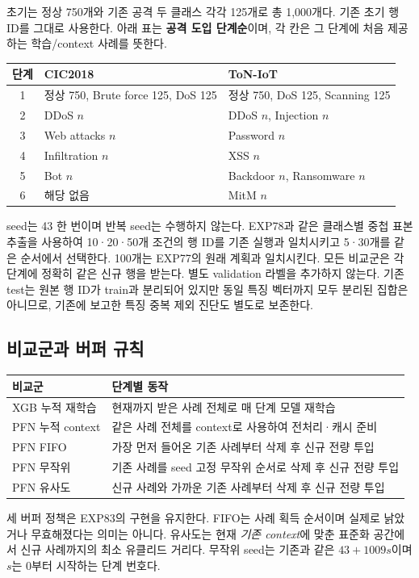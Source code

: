 초기는 정상 750개와 기존 공격 두 클래스 각각 125개로 총 1,000개다. 기존 초기 행 ID를 그대로 사용한다. 아래 표는 \textbf{공격 도입 단계순}이며, 각 칸은 그 단계에 처음 제공하는 학습/context 사례를 뜻한다.
\begin{table}[H]\centering\small
\begin{tabular}{cll}
\toprule
단계 & CIC2018 & ToN-IoT\\\midrule
1 & 정상 750, Brute force 125, DoS 125 & 정상 750, DoS 125, Scanning 125\\
2 & DDoS $n$ & DDoS $n$, Injection $n$\\
3 & Web attacks $n$ & Password $n$\\
4 & Infiltration $n$ & XSS $n$\\
5 & Bot $n$ & Backdoor $n$, Ransomware $n$\\
6 & 해당 없음 & MitM $n$\\\bottomrule
\end{tabular}
\end{table}
seed는 43 한 번이며 반복 seed는 수행하지 않는다. EXP78과 같은 클래스별 중첩 표본 추출을 사용하여 10·20·50개 조건의 행 ID를 기존 실행과 일치시키고 5·30개를 같은 순서에서 선택한다. 100개는 EXP77의 원래 계획과 일치시킨다. 모든 비교군은 각 단계에 정확히 같은 신규 행을 받는다. 별도 validation 라벨을 추가하지 않는다. 기존 test는 원본 행 ID가 train과 분리되어 있지만 동일 특징 벡터까지 모두 분리된 집합은 아니므로, 기존에 보고한 특징 중복 제외 진단도 별도로 보존한다.

\subsection{비교군과 버퍼 규칙}
\begin{table}[H]\centering\small
\begin{tabular}{p{.24\linewidth}p{.68\linewidth}}
\toprule
비교군 & 단계별 동작\\\midrule
XGB 누적 재학습 & 현재까지 받은 사례 전체로 매 단계 모델 재학습\\
PFN 누적 context & 같은 사례 전체를 context로 사용하여 전처리·캐시 준비\\
PFN FIFO & 가장 먼저 들어온 기존 사례부터 삭제 후 신규 전량 투입\\
PFN 무작위 & 기존 사례를 seed 고정 무작위 순서로 삭제 후 신규 전량 투입\\
PFN 유사도 & 신규 사례와 가까운 기존 사례부터 삭제 후 신규 전량 투입\\\bottomrule
\end{tabular}
\end{table}
세 버퍼 정책은 EXP83의 구현을 유지한다. FIFO는 사례 획득 순서이며 실제로 낡았거나 무효해졌다는 의미는 아니다. 유사도는 현재 \emph{기존 context}에 맞춘 표준화 공간에서 신규 사례까지의 최소 유클리드 거리다. 무작위 seed는 기존과 같은 $43+1009s$이며 $s$는 0부터 시작하는 단계 번호다.

